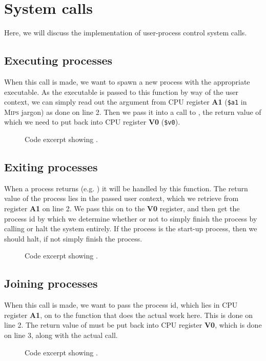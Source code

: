 %
%
%

\section{System calls}
Here, we will discuss the implementation of user-process control system calls.

\subsection{Executing processes}
When this call is made, we want to spawn a new process with the appropriate
executable. As the executable is passed to this function by way of the user
context, we can simply read out the argument from CPU register {\bf A1}
(\verb|$a1| in \textsc{Mips} jargon) as done on line 2. Then we pass it into a call to
, the return value of which we need to put back into CPU
register {\bf V0} (\verb|$v0|).

\begin{figure}[H]
    
    \caption{Code excerpt showing .}
    \label{code:handle_syscall_exec}
\end{figure}


\subsection{Exiting processes}
When a process returns (e.g. ) it will be handled by this
function. The return value of the process lies in the passed user context,
which we retrieve from register {\bf A1} on line 2. We pass this on to the
{\bf V0} register, and then get the process id by which we determine whether
or not to simply finish the process by calling  or halt
the system entirely. If the process is the start-up process, then we should
halt, if not simply finish the process.

\begin{figure}[H]
    
    \caption{Code excerpt showing .}
    \label{code:handle_syscall_exit}
\end{figure}


\subsection{Joining processes}
When this call is made, we want to pass the process id, which lies in CPU
register {\bf A1}, on to the  function that does the
actual work here. This is done on line 2. The return value of
 must be put back into CPU register {\bf V0}, which is
done on line 3, along with the actual call.

\begin{figure}[H]
    
    \caption{Code excerpt showing .}
    \label{code:handle_syscall_join}
\end{figure}

